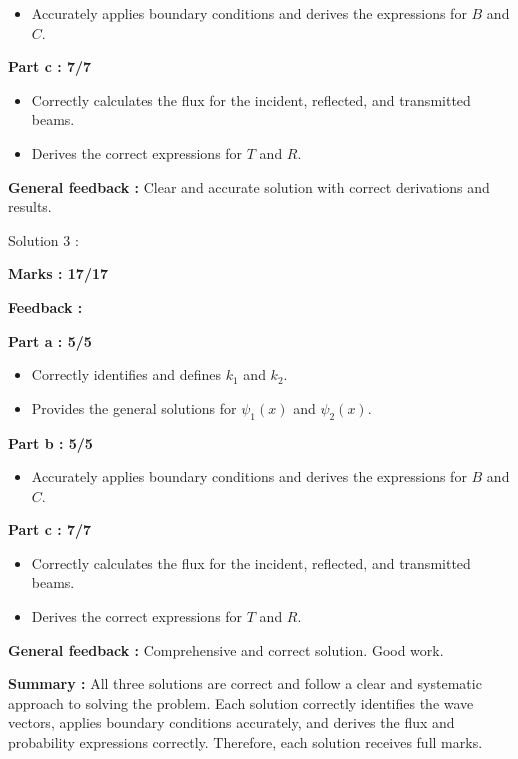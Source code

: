 \documentclass[a4paper,11pt]{article}
\begin{document}
\begin{itemize}
    \item Accurately applies boundary conditions and derives the expressions for $B$ and $C$.
\end{itemize}

\textbf{Part c : 7/7}

\begin{itemize}
    \item Correctly calculates the flux for the incident, reflected, and transmitted beams.
    \item Derives the correct expressions for $T$ and $R$.
\end{itemize}

\textbf{General feedback :}
Clear and accurate solution with correct derivations and results.


Solution 3 :

\textbf{Marks : 17/17}

\textbf{Feedback :}

\textbf{Part a : 5/5}

\begin{itemize}
    \item Correctly identifies and defines $k_1$ and $k_2$.
    \item Provides the general solutions for $\psi_1 (x)$ and $\psi_2 (x)$.
\end{itemize}

\textbf{Part b : 5/5}

\begin{itemize}
    \item Accurately applies boundary conditions and derives the expressions for $B$ and $C$.
\end{itemize}

\textbf{Part c : 7/7}

\begin{itemize}
    \item Correctly calculates the flux for the incident, reflected, and transmitted beams.
    \item Derives the correct expressions for $T$ and $R$.
\end{itemize}

\textbf{General feedback :}
Comprehensive and correct solution. Good work.


\textbf{Summary :}
All three solutions are correct and follow a clear and systematic approach to solving the problem. Each solution correctly identifies the wave vectors, applies boundary conditions accurately, and derives the flux and probability expressions correctly. Therefore, each solution receives full marks.
\end{document}
